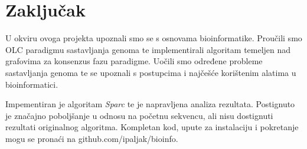 \chapter{Zaključak}

U okviru ovoga projekta upoznali smo se s osnovama bioinformatike.
Proučili smo OLC paradigmu sastavljanja genoma te implementirali algoritam temeljen nad grafovima za konsenzus fazu paradigme.
Uočili smo određene probleme sastavljanja genoma te se upoznali s postupcima i najčešće korištenim alatima u bioinformatici.

Impementiran je algoritam \emph{Sparc} te je napravljena analiza rezultata.
Postignuto je značajno poboljšanje u odnosu na početnu sekvencu, ali nisu dostignuti rezultati originalnog algoritma.
Kompletan kod, upute za instalaciju i pokretanje mogu se pronaći na github.com/ipaljak/bioinfo.

